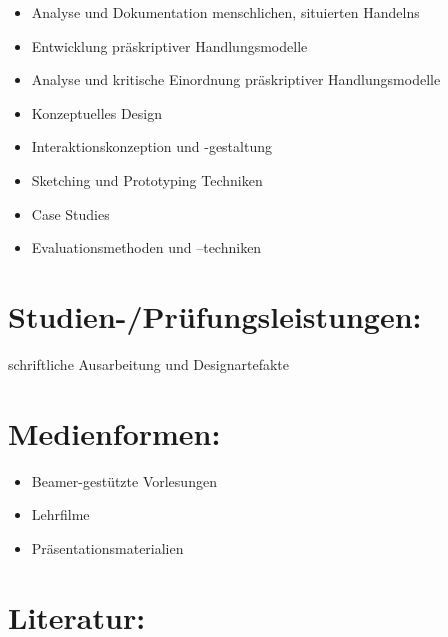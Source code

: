 \begin{itemize}
\tightlist
\item
  Analyse und Dokumentation menschlichen, situierten Handelns
\item
  Entwicklung präskriptiver Handlungsmodelle
\item
  Analyse und kritische Einordnung präskriptiver Handlungsmodelle
\item
  Konzeptuelles Design
\item
  Interaktionskonzeption und -gestaltung
\item
  Sketching und Prototyping Techniken
\item
  Case Studies
\item
  Evaluationsmethoden und --techniken
\end{itemize}

\section*{Studien-/Prüfungsleistungen:}\label{studien-pruxfcfungsleistungen-5}

schriftliche Ausarbeitung und Designartefakte

\section*{Medienformen:}\label{medienformen-5}

\begin{itemize}
\tightlist
\item
  Beamer-gestützte Vorlesungen
\item
  Lehrfilme
\item
  Präsentationsmaterialien
\end{itemize}

\section*{Literatur:}\label{literatur-5}

